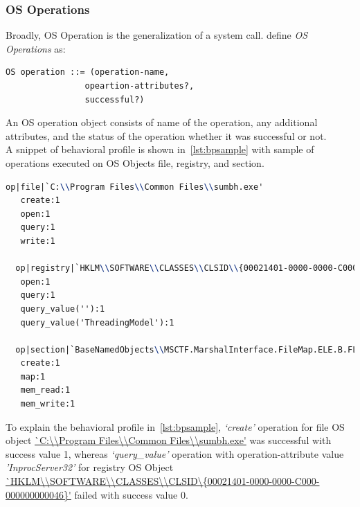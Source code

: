 \subsubsection{OS Operations}
\label{ssub:OS Operations}
Broadly, OS Operation is the generalization of a system call.
\citeauthor{bayer} define \emph{OS Operations} as:
\begin{lstlisting}
OS operation ::= (operation-name,
                opeartion-attributes?,
                successful?)
\end{lstlisting}
An OS operation object consists of name of the operation, any additional attributes, and the status of the operation whether it was successful or not.\\
A snippet of behavioral profile is shown in~\autoref{lst:bpsample} with sample of operations executed on OS Objects file, registry, and section.
\begin{lstlisting}[language=TeX,caption={Behvaioral Profile sample}, label={lst:bpsample}]
  op|file|`C:\\Program Files\\Common Files\\sumbh.exe'
   create:1
   open:1
   query:1
   write:1

  op|registry|`HKLM\\SOFTWARE\\CLASSES\\CLSID\\{00021401-0000-0000-C000-000000000046}'
   open:1
   query:1
   query_value(''):1
   query_value('ThreadingModel'):1

  op|section|`BaseNamedObjects\\MSCTF.MarshalInterface.FileMap.ELE.B.FLKMG'
   create:1
   map:1
   mem_read:1
   mem_write:1
\end{lstlisting}
To explain the behavioral profile in~\autoref{lst:bpsample}, \textit{`create'} operation for file OS object \url{`C:\\Program Files\\Common Files\\sumbh.exe'} was successful with success value 1, whereas \textit{`query\_value'} operation with operation-attribute value \emph{'InprocServer32'} for registry OS Object \url{`HKLM\\SOFTWARE\\CLASSES\\CLSID\\{00021401-0000-0000-C000-000000000046}'} failed with success value 0. %
\\

